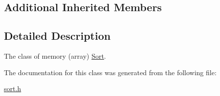 \subsection*{Additional Inherited Members}


\subsection{Detailed Description}
The class of memory (array) \mbox{\hyperlink{classilang_1_1_sort}{Sort}}. 

The documentation for this class was generated from the following file\+:\begin{DoxyCompactItemize}
\item 
\mbox{\hyperlink{sort_8h}{sort.\+h}}\end{DoxyCompactItemize}
